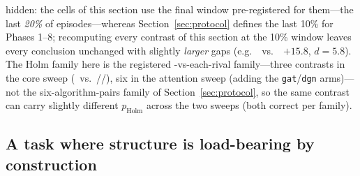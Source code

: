 hidden: the cells of this section use the final window pre-registered for
them---the last \emph{20\%} of episodes---whereas
Section~\ref{sec:protocol} defines the last 10\% for Phases 1--8;
recomputing every contrast of this section at the 10\% window leaves every
conclusion unchanged with slightly \emph{larger} gaps (e.g.\ \gtrue\ vs.\
\gcomplete\ $+15.8$, $d=5.8$). The Holm family here is the
registered \gtrue-vs-each-rival family---three contrasts in the core sweep
(\gtrue\ vs.\ \gwrong/\gcomplete/\mlpc), six in the attention sweep (adding the
\texttt{gat}/\texttt{dgn} arms)---not the six-algorithm-pairs family of
Section~\ref{sec:protocol}, so the same contrast can carry slightly different
$p_{\text{Holm}}$ across the two sweeps (both correct per family).

\subsection{A task where structure is load-bearing by construction}
\label{sec:pairrouting}

